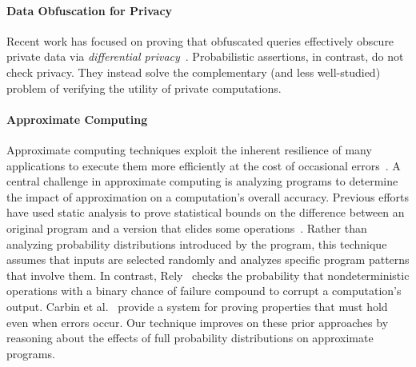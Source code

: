 \paragraph{Data Obfuscation for Privacy}
Recent work has focused on proving that obfuscated queries effectively
obscure private data via \emph{differential privacy}~\cite{pinq,
airavat, gupt, fuzz, certipriv}. Probabilistic assertions, in contrast, do not check
privacy. They instead solve the complementary (and less well-studied) problem
of verifying the utility of private computations.





\paragraph{Approximate Computing}
Approximate computing techniques exploit the inherent resilience of many
applications to execute them more efficiently at the cost of occasional
errors~\cite{enerj, npu, rely, perforation}.
A central challenge in approximate computing is analyzing programs to
determine the impact of approximation on a computation's overall accuracy.
Previous efforts have used static analysis to prove statistical bounds on the
difference between an original program and a version that elides some
operations~\cite{sasa-sas,zhu-popl}.
Rather than analyzing probability distributions introduced by the program, this technique assumes
that inputs are selected randomly and analyzes specific program patterns that
involve them.
In contrast, Rely~\cite{rely} checks the probability that nondeterministic
operations with a binary chance of failure compound to corrupt a computation's
output.
Carbin et al.~\cite{carbin-pldi} provide a system for proving properties that
must hold even when errors occur.
Our technique improves on these prior approaches by reasoning about the effects of
full probability distributions on approximate programs.


